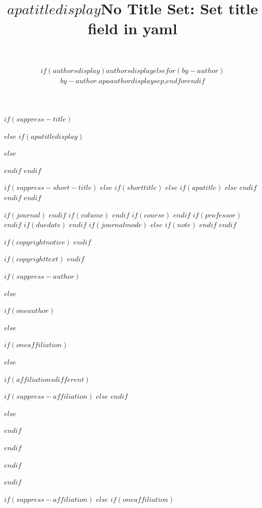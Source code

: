 $if(suppress-title)$
\title{}
$else$
$if(apatitledisplay)$
\title{$apatitledisplay$}
$else$
\title{No Title Set: Set title field in yaml}
$endif$
$endif$


$if(suppress-short-title)$
\shorttitle{}
$else$
$if(shorttitle)$
$else$
$if(apatitle)$
$else$
$endif$
$endif$
$endif$


\usepackage{etoolbox}


$if(journal)$
$endif$
$if(volume)$
$endif$
$if(course)$
$endif$
$if(professor)$
$endif$
$if(duedate)$
$endif$
$if(journalmode)$
$else$
$if(note)$
$endif$
$endif$

$if(copyrightnotice)$
$endif$

$if(copyrighttext)$
$endif$

$if(suppress-author)$
\author{~}
$else$

$if(oneauthor)$
\author{$if(authorsdisplay)$$authorsdisplay$$else$$for(by-author)$$by-author.apaauthordisplay$$sep$,$endfor$$endif$}
$else$

$if(oneaffiliation)$


$else$

$if(affiliationsdifferent)$

$if(suppress-affiliation)$
$else$
$endif$


$else$


$endif$

$endif$

$endif$

$endif$

$if(suppress-affiliation)$
\affiliation{}
$else$
$if(oneaffiliation)$

